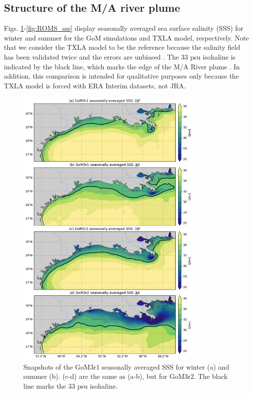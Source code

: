 \subsection{Structure of the M/A river plume}
Figs. \ref{fig:mpaso_sss}-\ref{fig:ROMS_sss} display seasonally averaged sea surface salinity (SSS) for winter and summer for the GoM simulations and TXLA model, respectively. Note that we consider the TXLA model to be the reference because the salinity field has been validated twice and the errors are unbiased \citep{Kobashi_2020, Zhang_2012_numerical}. The 33 psu isohaline is indicated by the black line, which marks the edge of the M/A River plume \citep{hetland2012integrated, thyng2018seasonal}. In addition, this comparison is intended for qualitative purposes only because the TXLA model is forced with ERA Interim datasets, not JRA.

\begin{figure}
\centerline{\includegraphics[width=0.82\textwidth]{figures/scgsr/mpaso_sss_mean.jpg}}
    \caption{Snapshots of the GoM3r1 seasonally averaged SSS for winter (a) and summer (b). (c-d) are the same as (a-b), but for GoM3r2. The black line marks the 33 psu isohaline.}
    \label{fig:mpaso_sss}
\end{figure}

